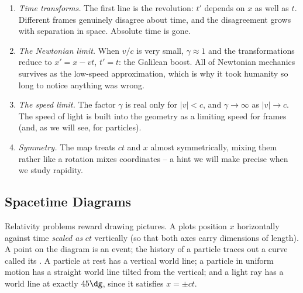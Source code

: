 \begin{enumerate}[label=(\roman*)]
	\item \emph{Time transforms.} The first line is the revolution: $t'$ depends on $x$ as well as $t$. Different frames genuinely disagree about time, and the disagreement grows with separation in space. Absolute time is gone.
	\item \emph{The Newtonian limit.} When $v/c$ is very small, $\gamma \approx 1$ and the transformations reduce to $x' = x - vt$, $t' = t$: the Galilean boost. All of Newtonian mechanics survives as the low-speed approximation, which is why it took humanity so long to notice anything was wrong.
	\item \emph{The speed limit.} The factor $\gamma$ is real only for $|v| < c$, and $\gamma \to \infty$ as $|v| \to c$. The speed of light is built into the geometry as a limiting speed for frames (and, as we will see, for particles).
	\item \emph{Symmetry.} The map treats $ct$ and $x$ almost symmetrically, mixing them rather like a rotation mixes coordinates -- a hint we will make precise when we study rapidity.
\end{enumerate}

\subsection{Spacetime Diagrams}

Relativity problems reward drawing pictures. A  plots position $x$ horizontally against time \emph{scaled as} $ct$ vertically (so that both axes carry dimensions of length). A point on the diagram is an event; the history of a particle traces out a curve called its . A particle at rest has a vertical world line; a particle in uniform motion has a straight world line tilted from the vertical; and a light ray has a world line at exactly $45\dg$, since it satisfies $x = \pm ct$.

\begin{center}
\end{center}

